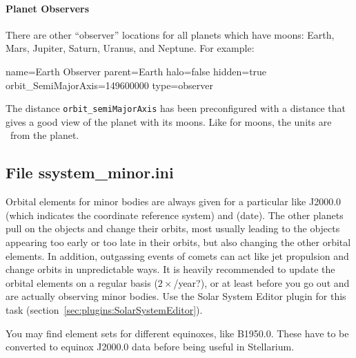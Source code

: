 \paragraph{Planet Observers}
\label{sec:ssystem.ini:PlanetObserver}

There are other ``observer'' locations for all planets  which have moons: Earth, Mars, Jupiter, Saturn, Uranus, and Neptune.
For example:
\begin{configfile}
name=Earth Observer
parent=Earth
halo=false
hidden=true
orbit_SemiMajorAxis=149600000
type=observer
\end{configfile}

The distance \texttt{orbit\_semiMajorAxis} has been preconfigured  with a
distance that gives a good view of the planet with its moons. 
Like for moons, the units are \km\ from the planet. 

\subsection{File ssystem\_minor.ini}
\label{sec:ssystem.ini:minor}

Orbital elements for minor bodies are always given for a particular
 like J2000.0 (which indicates the coordinate
reference system) and  (date). The other planets pull
on the objects and change their orbits, most usually leading to the
objects appearing too early or too late in their orbits, but also
changing the other orbital elements. In addition, outgassing events of
comets can act like jet propulsion and change orbits in unpredictable
ways.  It is heavily recommended to update the orbital elements on a
regular basis ($2\times$/year?), or at least before you go out and are
actually observing minor bodies.  Use the Solar System Editor plugin
for this task (section~\ref{sec:plugins:SolarSystemEditor}).

You may find element sets for different equinoxes, like B1950.0. These
have to be converted to equinox J2000.0 data before being useful in
Stellarium.

